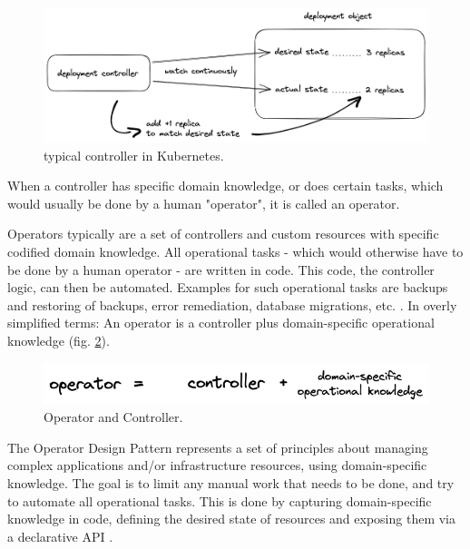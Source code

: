 \begin{figure}[h]
	\centering
	\includegraphics[width=1.00\linewidth]{assets/typical-controller.png}
	\caption{typical controller in Kubernetes.
	}
	\label{fig:typicalControllerKubernetes}	
\end{figure}

When a controller has specific domain knowledge,
or does certain tasks, which would usually be done by a human "operator",
it is called an operator.

Operators typically are a set of controllers and custom resources
with specific codified domain knowledge.
All operational tasks -
which would otherwise have to be done by a human operator -
are written in code.
This code, the controller logic, can then be automated.
Examples for such operational tasks are
backups and restoring of backups, error remediation, database migrations, etc.
\autocite{operatorWhitepaperV1}.
In overly simplified terms:
An operator is a controller plus domain-specific operational knowledge
(fig. \ref{fig:operatorAndController}).

\begin{figure}[h]
	\centering
	\includegraphics[width=1.00\linewidth]{assets/operator-is-controller-domain-knowledge.png}
	\caption{Operator and Controller.
	}
	\label{fig:operatorAndController}	
\end{figure}

The Operator Design Pattern represents a set of principles about
managing complex applications and/or infrastructure resources,
using domain-specific knowledge.
The goal is to limit any manual work that needs to be done,
and try to automate all operational tasks.
This is done by capturing domain-specific knowledge in code,
defining the desired state of resources and exposing them
via a declarative API
\autocite{operatorWhitepaperV1}.

